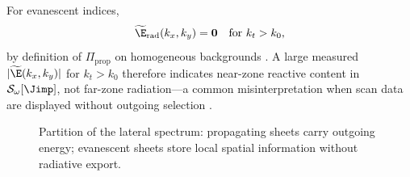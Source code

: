 For evanescent indices,
\begin{equation}
\label{eq:ch2.evanescent-angular-null-law}
\widetilde{\E}_{\mathrm{rad}}(k_x,k_y)=\mathbf{0}
\quad\text{for}\ k_t>k_0,
\end{equation}
by definition of $\Pi_{\mathrm{prop}}$ on homogeneous backgrounds \cite{stratton1941}. A large measured $|\widetilde{\E}(k_x,k_y)|$ for $k_t>k_0$ therefore indicates near-zone reactive content in $\mathcal{S}_\omega[\Jimp]$, not far-zone radiation---a common misinterpretation when scan data are displayed without outgoing selection \cite{hansen1988,devaney2004}.

\begin{figure}[t]
\centering
{}
\caption{Partition of the lateral spectrum: propagating sheets carry outgoing energy; evanescent sheets store local spatial information without radiative export.}
\label{fig:ch2.propagating-evanescent-spectrum}
\end{figure}

